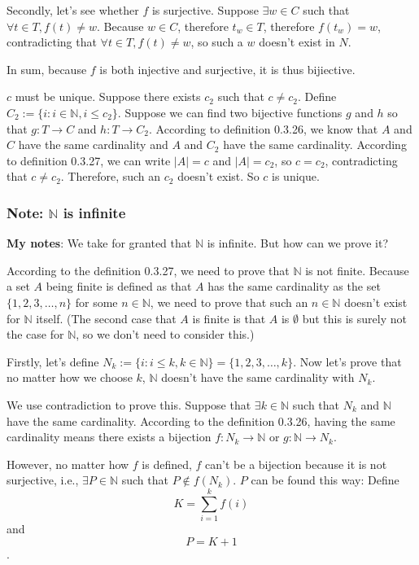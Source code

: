 \documentclass[12pt, letterpaper, oneside]{book}
\begin{document}
Secondly, let's see whether $f$ is surjective. Suppose $\exists w \in C$ such
that $\forall t \in T, f(t) \neq w$. Because $w \in C$, therefore $t_w \in T$,
therefore $f(t_w) = w$, contradicting that $\forall t \in T, f(t) \neq w$, so
such a $w$ doesn't exist in $N$.

In sum, because $f$ is both injective and surjective, it is thus bijiective.

$c$ must be unique. Suppose there exists $c_2$ such that $c \neq c_2$.
Define $C_2:= \{i: i \in \mathbb{N}, i \leq c_2\}$. Suppose we can find two
bijective functions $g$ and $h$ so that $g: T \rightarrow C$ and $h: T
  \rightarrow C_2$. According to definition 0.3.26, we know that $A$ and $C$ have
the same cardinality and $A$ and $C_2$ have the same cardinality. According to
definition 0.3.27, we can write $|A| = c$ and $|A| = c_2$, so $c = c_2$,
contradicting that $c \neq c_2$. Therefore, such an $c_2$ doesn't exist. So $c$
is unique.

\subsubsection{Note: $\mathbb{N}$ is infinite}

\colorbox{lime!100}{\textbf{My notes}}: We take for granted that $\mathbb{N}$
is infinite. But how can we prove it?

According to the definition 0.3.27, we need to prove that $\mathbb{N}$ is not
finite. Because a set $A$ being finite is defined as that $A$ has the same
cardinality as the set $\{1, 2, 3, \ldots, n\}$ for some $n \in \mathbb{N}$, we
need to prove that such an $n \in \mathbb{N}$ doesn't exist for $\mathbb{N}$
itself. (The second case that $A$ is finite is that $A$ is $\emptyset$ but this
is surely not the case for $\mathbb{N}$, so we don't need to consider this.)

Firstly, let's define $N_k:= \{i: i \leq k, k \in \mathbb{N}\} = \{1, 2, 3,
  \ldots, k\}$. Now let's prove that no matter how we choose $k$, $\mathbb{N}$
doesn't have the same cardinality with $N_k$.

We use contradiction to prove this. Suppose that $\exists k \in \mathbb{N}$
such that $N_k$ and $\mathbb{N}$ have the same cardinality. According to the
definition 0.3.26, having the same cardinality means there exists a bijection
$f: N_k \rightarrow \mathbb{N}$ or $g: \mathbb{N} \rightarrow N_k$.

However, no matter how $f$ is defined, $f$ can't be a bijection because it is
not surjective, i.e., $\exists P \in \mathbb{N}$ such that $P \notin f(N_k)$.
$P$ can be found this way: Define \[K = \sum_{i=1}^{k} f(i) \] and \[P = K +
  1\].
\end{document}

